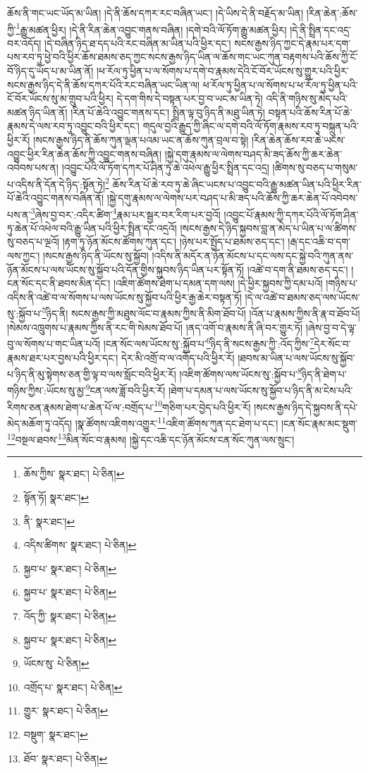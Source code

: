 ཆོས་ནི་གང་ཡང་ཡོད་མ་ཡིན། །དེ་ནི་ཆོས་དཀར་རང་བཞིན་ཡང་། །དེ་ཡིས་དེ་ནི་བརྗོད་མ་ཡིན། །རིན་ཆེན་:ཆོས་ཀྱི་\footnote{ཆོས་ཀྱིས་  སྣར་ཐང་།  པེ་ཅིན། }རྒྱུ་མཚན་ཕྱིར། །དེ་ནི་རིན་ཆེན་འབྱུང་གནས་བཞིན། །དགེ་བའི་ལོ་ཏོག་རྒྱུ་མཚན་ཕྱིར། །དེ་ནི་སྤྲིན་དང་འདྲ་བར་འདོད། །དེ་བཞིན་ཉིད་ཐ་དད་པའི་རང་བཞིན་མ་ཡིན་པའི་ཕྱིར་དང་། སངས་རྒྱས་ཉིད་ཀྱང་དེ་རྣམ་པར་དག་པས་རབ་ཏུ་ཕྱེ་བའི་ཕྱིར་ཆོས་ཐམས་ཅད་ཀྱང་སངས་རྒྱས་ཉིད་ཡིན་ལ་ཆོས་གང་ཡང་ཀུན་བརྟགས་པའི་ཆོས་ཀྱི་ངོ་བོ་ཉིད་དུ་ཡོད་པ་མ་ཡིན་ནོ། །ཕ་རོལ་ཏུ་ཕྱིན་པ་ལ་སོགས་པ་དགེ་བ་རྣམས་དེའི་ངོ་བོར་ཡོངས་སུ་གྱུར་པའི་ཕྱིར་སངས་རྒྱས་ཉིད་དེ་ནི་ཆོས་དཀར་པོའི་རང་བཞིན་ཡང་ཡིན་ལ། ཕ་རོལ་ཏུ་ཕྱིན་པ་ལ་སོགས་པ་ཕ་རོལ་ཏུ་ཕྱིན་པའི་ངོ་བོར་ཡོངས་སུ་མ་གྲུབ་པའི་ཕྱིར། དེ་དག་གིས་དེ་བསྟན་པར་བྱ་བ་ཡང་མ་ཡིན་ཏེ། འདི་ནི་གཉིས་སུ་མེད་པའི་མཚན་ཉིད་ཡིན་ནོ། །རིན་པོ་ཆེའི་འབྱུང་གནས་དང་། སྤྲིན་ལྟ་བུ་ཉིད་ནི་མཐུ་ཡིན་ཏེ། བསྟན་པའི་ཆོས་རིན་པོ་ཆེ་རྣམས་དེ་ལས་རབ་ཏུ་འབྱུང་བའི་ཕྱིར་དང་། གདུལ་བྱའི་རྒྱུད་ཀྱི་ཞིང་ལ་དགེ་བའི་ལོ་ཏོག་རྣམས་རབ་ཏུ་བསྐྲུན་པའི་ཕྱིར་རོ། །སངས་རྒྱས་ཉིད་ནི་ཆོས་ཀུན་ལྡན་པའམ་ཡང་ན་ཆོས་ཀུན་བྲལ་བ་སྟེ། །རིན་ཆེན་ཆོས་རབ་ཆེ་ཡངས་འབྱུང་ཕྱིར་རིན་ཆེན་ཆོས་ཀྱི་འབྱུང་གནས་བཞིན། །སྐྱེ་དགུ་རྣམས་ལ་ལེགས་བཤད་མི་ཟད་ཆོས་ཀྱི་ཆར་ཆེན་འབེབས་པས་ན། །འབྱུང་པོའི་ལོ་ཏོག་དཀར་པོ་ཤིན་ཏུ་ཆེ་འཕེལ་རྒྱུ་ཕྱིར་སྤྲིན་དང་འདྲ། །ཚིགས་སུ་བཅད་པ་གསུམ་པ་འདིས་ནི་དོན་དེ་ཉིད་:སྟོན་ཏེ།\footnote{སྟོན་ཏོ།  སྣར་ཐང་། } ཆོས་རིན་པོ་ཆེ་རབ་ཏུ་ཆེ་ཞིང་ཡངས་པ་འབྱུང་བའི་རྒྱུ་མཚན་ཡིན་པའི་ཕྱིར་རིན་པོ་ཆེའི་འབྱུང་གནས་བཞིན་ནོ། །སྐྱེ་དགུ་རྣམས་ལ་ལེགས་པར་བཤད་པ་མི་ཟད་པའི་ཆོས་ཀྱི་ཆར་ཆེན་པོ་འབེབས་པས་ན་\footnote{ནི་  སྣར་ཐང་། }ཞེས་བྱ་བར་:འདིར་ཚིག་\footnote{འདིས་ཚིགས་  སྣར་ཐང་།  པེ་ཅིན། }རྣམ་པར་སྦྱར་བར་རིག་པར་བྱའོ། །འབྱུང་པོ་རྣམས་ཀྱི་དཀར་པོའི་ལོ་ཏོག་ཤིན་ཏུ་ཆེན་པོ་འཕེལ་བའི་རྒྱུ་ཡིན་པའི་ཕྱིར་སྤྲིན་དང་འདྲའོ། །སངས་རྒྱས་དེ་ཉིད་སྐྱབས་བླ་ན་མེད་པ་ཡིན་པ་ལ་ཚིགས་སུ་བཅད་པ་ལྔའོ། །རྟག་ཏུ་ཉོན་མོངས་ཚོགས་ཀུན་དང་། །ཉེས་པར་སྤྱོད་པ་ཐམས་ཅད་དང་། །རྒ་དང་འཆི་བ་དག་ལས་ཀྱང་། །སངས་རྒྱས་ཉིད་ནི་ཡོངས་སུ་སྐྱོབ། །འདིས་ནི་མདོར་ན་ཉོན་མོངས་པ་དང་ལས་དང་སྐྱེ་བའི་ཀུན་ནས་ཉོན་མོངས་པ་ལས་ཡོངས་སུ་སྐྱོབ་པའི་དོན་གྱིས་སྐྱབས་ཉིད་ཡིན་པར་སྟོན་ཏོ། །འཚེ་བ་དག་ནི་ཐམས་ཅད་དང་། །ངན་སོང་དང་ནི་ཐབས་མིན་དང་། །འཇིག་ཚོགས་ཐེག་པ་དམན་དག་ལས། །དེ་ཕྱིར་སྐྱབས་ཀྱི་དམ་པའོ། །གཉིས་པ་འདིས་ནི་འཚེ་བ་ལ་སོགས་པ་ལས་ཡོངས་སུ་སྐྱོབ་པའི་ཕྱིར་རྒྱ་ཆེར་བསྟན་ཏོ། །དེ་ལ་འཚེ་བ་ཐམས་ཅད་ལས་ཡོངས་སུ་:སྐྱོབ་པ་\footnote{སྐྱབ་པ་  སྣར་ཐང་།  པེ་ཅིན། }ཉིད་ནི། སངས་རྒྱས་ཀྱི་མཐུས་ལོང་བ་རྣམས་ཀྱིས་ནི་མིག་ཐོབ་པོ། །འོན་པ་རྣམས་ཀྱིས་ནི་རྣ་བ་ཐོབ་པོ། །སེམས་འཁྲུགས་པ་རྣམས་ཀྱིས་ནི་རང་གི་སེམས་ཐོབ་པོ། །ནད་འགོ་བ་རྣམས་ནི་ཞི་བར་གྱུར་ཏོ། །ཞེས་བྱ་བ་དེ་ལྟ་བུ་ལ་སོགས་པ་གང་ཡིན་པའོ། །ངན་སོང་ལས་ཡོངས་སུ་:སྐྱོབ་པ་\footnote{སྐྱབ་པ་  སྣར་ཐང་།  པེ་ཅིན། }ཉིད་ནི་སངས་རྒྱས་ཀྱི་:འོད་ཀྱིས་\footnote{འོད་ཀྱི་  སྣར་ཐང་།  པེ་ཅིན། }དེར་སོང་བ་རྣམས་ཐར་པར་བྱས་པའི་ཕྱིར་དང་། དེར་མི་འགྲོ་བ་ལ་འགོད་པའི་ཕྱིར་རོ། །ཐབས་མ་ཡིན་པ་ལས་ཡོངས་སུ་སྐྱོབ་པ་ཉིད་ནི་མུ་སྟེགས་ཅན་གྱི་ལྟ་བ་ལས་སློང་བའི་ཕྱིར་རོ། །འཇིག་ཚོགས་ལས་ཡོངས་སུ་:སྐྱོབ་པ་\footnote{སྐྱབ་པ་  སྣར་ཐང་།  པེ་ཅིན། }ཉིད་ནི་ཐེག་པ་གཉིས་ཀྱིས་:ཡོངས་སུ་མྱ་\footnote{ཡོངས་སུ་  པེ་ཅིན། }ངན་ལས་ཟློ་བའི་ཕྱིར་རོ། །ཐེག་པ་དམན་པ་ལས་ཡོངས་སུ་སྐྱོབ་པ་ཉིད་ནི་མ་ངེས་པའི་རིགས་ཅན་རྣམས་ཐེག་པ་ཆེན་པོ་ལ་:བགྲོད་པ་\footnote{འགྲོད་པ་  སྣར་ཐང་།  པེ་ཅིན། }གཅིག་པར་བྱེད་པའི་ཕྱིར་རོ། །སངས་རྒྱས་ཉིད་དེ་སྐྱབས་ནི་དཔེ་མེད་མཆོག་ཏུ་འདོད། །སྣ་ཚོགས་འཇིགས་འགྱུར་\footnote{གྱུར་  སྣར་ཐང་།  པེ་ཅིན། }འཇིག་ཚོགས་ཀུན་དང་ཐེག་པ་དང་། །ངན་སོང་རྣམ་མང་སྡུག་\footnote{བསྡུག་  སྣར་ཐང་། }བསྔལ་ཐབས་\footnote{ཐོབ་  སྣར་ཐང་།  པེ་ཅིན། }མིན་སོང་བ་རྣམས། །སྐྱེ་དང་འཆི་དང་ཉོན་མོངས་ངན་སོང་ཀུན་ལས་སྲུང་། 
